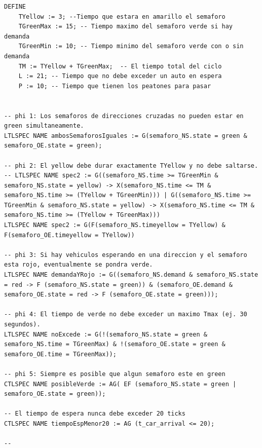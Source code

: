 \begin{lstlisting}[language=NuSMV, caption={Modelo con errores introducidos para violar specs 1, 2 y 3}]
DEFINE
    TYellow := 3; --Tiempo que estara en amarillo el semaforo
    TGreenMax := 15; -- Tiempo maximo del semaforo verde si hay demanda
    TGreenMin := 10; -- Tiempo minimo del semaforo verde con o sin demanda
    TM := TYellow + TGreenMax;  -- El tiempo total del ciclo
    L := 21; -- Tiempo que no debe exceder un auto en espera
    P := 10; -- Tiempo que tienen los peatones para pasar


-- phi 1: Los semaforos de direcciones cruzadas no pueden estar en green simultaneamente.
LTLSPEC NAME ambosSemaforosIguales := G(semaforo_NS.state = green & semaforo_OE.state = green);

-- phi 2: El yellow debe durar exactamente TYellow y no debe saltarse.
-- LTLSPEC NAME spec2 := G((semaforo_NS.time >= TGreenMin & semaforo_NS.state = yellow) -> X(semaforo_NS.time <= TM & semaforo_NS.time >= (TYellow + TGreenMin))) | G((semaforo_NS.time >= TGreenMin & semaforo_NS.state = yellow) -> X(semaforo_NS.time <= TM & semaforo_NS.time >= (TYellow + TGreenMax)))
LTLSPEC NAME spec2 := G(F(semaforo_NS.timeyellow = TYellow) & F(semaforo_OE.timeyellow = TYellow))

-- phi 3: Si hay vehiculos esperando en una direccion y el semaforo esta rojo, eventualmente se pondra verde.
LTLSPEC NAME demandaYRojo := G((semaforo_NS.demand & semaforo_NS.state = red -> F (semaforo_NS.state = green)) & (semaforo_OE.demand & semaforo_OE.state = red -> F (semaforo_OE.state = green)));

-- phi 4: El tiempo de verde no debe exceder un maximo Tmax (ej. 30 segundos).
LTLSPEC NAME noExcede := G(!(semaforo_NS.state = green &  semaforo_NS.time = TGreenMax) & !(semaforo_OE.state = green &  semaforo_OE.time = TGreenMax)); 

-- phi 5: Siempre es posible que algun semaforo este en green
CTLSPEC NAME posibleVerde := AG( EF (semaforo_NS.state = green | semaforo_OE.state = green));

-- El tiempo de espera nunca debe exceder 20 ticks
CTLSPEC NAME tiempoEspMenor20 := AG (t_car_arrival <= 20);

-- 
\end{lstlisting}

